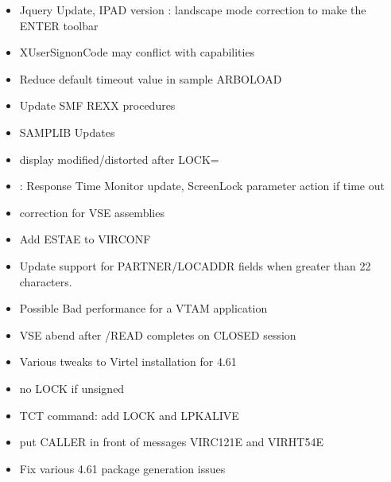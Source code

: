 \documentclass[letterpaper,10pt,english]{sphinxmanual}
\begin{document}
\begin{itemize}
\item {} 
 Jquery Update, IPAD version : landscape mode correction to make the ENTER toolbar

\item {} 
 X\sphinxhyphen{}UserSignonCode may conflict with capabilities

\item {} 
 Reduce default timeout value in sample ARBOLOAD

\item {} 
 Update SMF REXX procedures

\item {} 
 SAMPLIB Updates

\item {} 
 display modified/distorted after LOCK=

\item {} 
 : Response Time Monitor update, Screen\sphinxhyphen{}Lock parameter action if time out

\item {} 
 correction for VSE assemblies

\item {} 
 Add ESTAE to VIRCONF

\item {} 
 Update support for PARTNER/LOCADDR fields when greater than 22 characters.

\item {} 
 Possible Bad performance for a VTAM application

\item {} 
 VSE abend after /READ completes on CLOSED session

\item {} 
 Various tweaks to Virtel installation for 4.61

\item {} 
 no LOCK if unsigned

\item {} 
 TCT command: add LOCK and LPKALIVE

\item {} 
 put CALLER in front of messages VIRC121E and VIRHT54E

\item {} 
 Fix various 4.61 package generation issues


\end{itemize}
\end{document}
